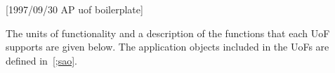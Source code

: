 [1997/09/30 AP uof boilerplate]

  The units of functionality and a description of the functions
that each UoF supports are given below. The application objects
included in the UoFs are defined in~\ref{;sao}.

\endinput
